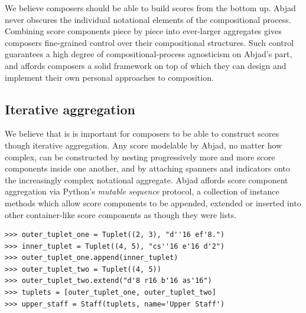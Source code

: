 \documentclass{article}
\begin{document}
We believe composers should be able to build scores from the bottom up. Abjad
never obscures the individual notational elements of the compositional process.
Combining score components piece by piece into ever-larger aggregates gives
composers fine-grained control over their compositional structures. Such
control guarantees a high degree of compositional-process agnosticism on
Abjad's part, and affords composers a solid framework on top of which they can
design and implement their own personal approaches to composition.


\subsection{Iterative aggregation}

We believe that is is important for composers to be able to construct scores
though iterative aggregation. Any score modelable by Abjad, no matter how
complex, can be constructed by nesting progressively more and more score
components inside one another, and by attaching spanners and indicators onto
the increasingly complex notational aggregate. Abjad affords score component
aggregation via Python's \emph{mutable sequence} protocol, a collection of
instance methods which allow score components to be appended, extended or
inserted into other container-like score components as though they were lists.

\begin{lstlisting}
>>> outer_tuplet_one = Tuplet((2, 3), "d''16 ef'8.")
>>> inner_tuplet = Tuplet((4, 5), "cs''16 e'16 d'2")
>>> outer_tuplet_one.append(inner_tuplet)
>>> outer_tuplet_two = Tuplet((4, 5))
>>> outer_tuplet_two.extend("d'8 r16 b'16 as'16")
>>> tuplets = [outer_tuplet_one, outer_tuplet_two]
>>> upper_staff = Staff(tuplets, name='Upper Staff')
\end{lstlisting}
\end{document}
